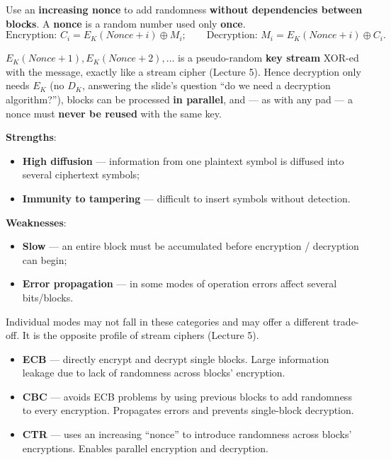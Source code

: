 \begin{defnbox}[title={Mode 3: Counter mode (CTR)}]
Use an \textbf{increasing nonce} to add randomness \textbf{without dependencies between
blocks}. A \textbf{nonce} is a random number used only \textbf{once}.
\[
  \text{Encryption: } C_i = E_K(\mathit{Nonce} + i) \oplus M_i;
  \qquad
  \text{Decryption: } M_i = E_K(\mathit{Nonce} + i) \oplus C_i .
\]
\end{defnbox}

\begin{rembox}[title=CTR turns a block cipher into a stream cipher]
$E_K(\mathit{Nonce}+1), E_K(\mathit{Nonce}+2), \ldots$ is a pseudo-random \textbf{key
stream} XOR-ed with the message, exactly like a stream cipher (Lecture 5). Hence
decryption only needs $E_K$ (no $D_K$, answering the slide's question ``do we need a
decryption algorithm?''), blocks can be processed \textbf{in parallel}, and --- as with
any pad --- a nonce must \textbf{never be reused} with the same key.
\end{rembox}

\begin{propbox}[title=Block ciphers: strengths and weaknesses]
\textbf{Strengths}:
\begin{itemize}
  \item \textbf{High diffusion} --- information from one plaintext symbol is diffused
        into several ciphertext symbols;
  \item \textbf{Immunity to tampering} --- difficult to insert symbols without detection.
\end{itemize}
\textbf{Weaknesses}:
\begin{itemize}
  \item \textbf{Slow} --- an entire block must be accumulated before encryption /
        decryption can begin;
  \item \textbf{Error propagation} --- in some modes of operation errors affect several
        bits/blocks.
\end{itemize}
Individual modes may not fall in these categories and may offer a different trade-off.
It is the opposite profile of stream ciphers (Lecture 5).
\end{propbox}

\begin{keybox}[title=Modes of operation: summary]
\begin{itemize}
  \item \textbf{ECB} --- directly encrypt and decrypt single blocks. Large information
        leakage due to lack of randomness across blocks' encryption.
  \item \textbf{CBC} --- avoids ECB problems by using previous blocks to add randomness to
        every encryption. Propagates errors and prevents single-block decryption.
  \item \textbf{CTR} --- uses an increasing ``nonce'' to introduce randomness across
        blocks' encryptions. Enables parallel encryption and decryption.
\end{itemize}
\end{keybox}

